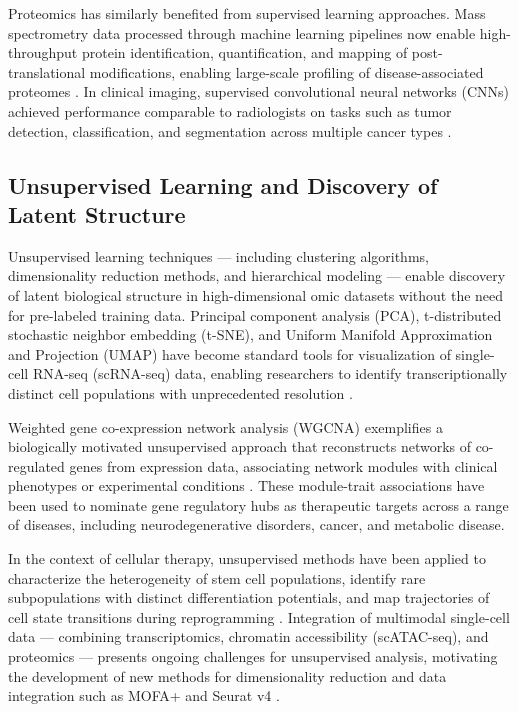 Proteomics has similarly benefited from supervised learning approaches. Mass spectrometry data processed through machine learning pipelines now enable high-throughput protein identification, quantification, and mapping of post-translational modifications, enabling large-scale profiling of disease-associated proteomes \parencite{orre2019}. In clinical imaging, supervised convolutional neural networks (CNNs) achieved performance comparable to radiologists on tasks such as tumor detection, classification, and segmentation across multiple cancer types \parencite{litjens2017}.

\subsection{Unsupervised Learning and Discovery of Latent Structure}

Unsupervised learning techniques --- including clustering algorithms, dimensionality reduction methods, and hierarchical modeling --- enable discovery of latent biological structure in high-dimensional omic datasets without the need for pre-labeled training data. Principal component analysis (PCA), t-distributed stochastic neighbor embedding (t-SNE), and Uniform Manifold Approximation and Projection (UMAP) have become standard tools for visualization of single-cell RNA-seq (scRNA-seq) data, enabling researchers to identify transcriptionally distinct cell populations with unprecedented resolution \parencite{mcinnes2018, becht2018}.

Weighted gene co-expression network analysis (WGCNA) exemplifies a biologically motivated unsupervised approach that reconstructs networks of co-regulated genes from expression data, associating network modules with clinical phenotypes or experimental conditions \parencite{langfelder2008}. These module-trait associations have been used to nominate gene regulatory hubs as therapeutic targets across a range of diseases, including neurodegenerative disorders, cancer, and metabolic disease.

In the context of cellular therapy, unsupervised methods have been applied to characterize the heterogeneity of stem cell populations, identify rare subpopulations with distinct differentiation potentials, and map trajectories of cell state transitions during reprogramming \parencite{saelens2019}. Integration of multimodal single-cell data --- combining transcriptomics, chromatin accessibility (scATAC-seq), and proteomics --- presents ongoing challenges for unsupervised analysis, motivating the development of new methods for dimensionality reduction and data integration such as MOFA+ and Seurat v4 \parencite{argelaguet2020, hao2021}.

